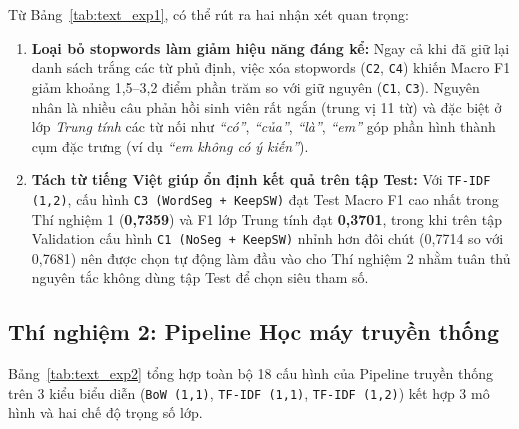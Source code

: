 \documentclass[12pt,a4paper]{article}
\begin{document}
Từ Bảng~\ref{tab:text_exp1}, có thể rút ra hai nhận xét quan trọng:
\begin{enumerate}
    \item \textbf{Loại bỏ stopwords làm giảm hiệu năng đáng kể:} Ngay cả khi đã giữ lại danh sách trắng các từ phủ định, việc xóa stopwords (\texttt{C2}, \texttt{C4}) khiến Macro F1 giảm khoảng 1,5--3,2 điểm phần trăm so với giữ nguyên (\texttt{C1}, \texttt{C3}). Nguyên nhân là nhiều câu phản hồi sinh viên rất ngắn (trung vị 11 từ) và đặc biệt ở lớp \textit{Trung tính} các từ nối như \textit{``có''}, \textit{``của''}, \textit{``là''}, \textit{``em''} góp phần hình thành cụm đặc trưng (ví dụ \textit{``em không có ý kiến''}).
    \item \textbf{Tách từ tiếng Việt giúp ổn định kết quả trên tập Test:} Với \texttt{TF-IDF (1,2)}, cấu hình \texttt{C3 (WordSeg + KeepSW)} đạt Test Macro F1 cao nhất trong Thí nghiệm 1 (\textbf{0,7359}) và F1 lớp Trung tính đạt \textbf{0,3701}, trong khi trên tập Validation cấu hình \texttt{C1 (NoSeg + KeepSW)} nhỉnh hơn đôi chút (0,7714 so với 0,7681) nên được chọn tự động làm đầu vào cho Thí nghiệm 2 nhằm tuân thủ nguyên tắc không dùng tập Test để chọn siêu tham số.
\end{enumerate}

\subsection{Thí nghiệm 2: Pipeline Học máy truyền thống}
Bảng~\ref{tab:text_exp2} tổng hợp toàn bộ 18 cấu hình của Pipeline truyền thống trên 3 kiểu biểu diễn (\texttt{BoW (1,1)}, \texttt{TF-IDF (1,1)}, \texttt{TF-IDF (1,2)}) kết hợp 3 mô hình và hai chế độ trọng số lớp.
\end{document}
